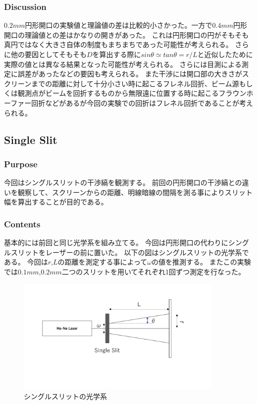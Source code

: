 \documentclass[11pt, a4paper]{jsarticle}
\begin{document}
\subsubsection{Discussion}
$0.2mm$円形開口の実験値と理論値の差は比較的小さかった。一方で$0.4mm$円形開口の理論値との差はかなりの開きがあった。
これは円形開口の円がそもそも真円ではなく大きさ自体の制度もまちまちであった可能性が考えられる。
さらに他の要因としてそもそも$D$を算出する際に$sin\theta \simeq tan\theta = r/L$と近似したために実際の値とは異なる結果となった可能性が考えられる。
さらには目測による測定に誤差があったなどの要因も考えられる。
また干渉には開口部の大きさがスクリーンまでの距離に対して十分小さい時に起こるフレネル回折、ビーム源もしくは観測点がビームを回折するものから無限遠に位置する時に起こるフラウンホーファー回折などがあるが今回の実験での回折はフレネル回折であることが考えられる。
\subsection{Single Slit}
\subsubsection{Purpose}
今回はシングルスリットの干渉縞を観測する。
前回の円形開口の干渉縞との違いを観察して、スクリーンからの距離、明線暗線の間隔を測る事によりスリット幅を算出することが目的である。
\subsubsection{Contents}
基本的には前回と同じ光学系を組み立てる。
今回は円形開口の代わりにシングルスリットをレーザーの前に置いた。
以下の図はシングルスリットの光学系である。
今回は$r$,$L$の距離を測定する事によって$\omega$の値を推測する。
またこの実験では$0.1mm$,$0.2mm$二つのスリットを用いてそれぞれ1回ずつ測定を行なった。
\begin{figure}[htbp]
 \begin{center}
  \includegraphics[width=100mm]{fig8.png}
 \end{center}
 \caption{シングルスリットの光学系}
 \label{fig:eight}
\end{figure}\\
\end{document}
